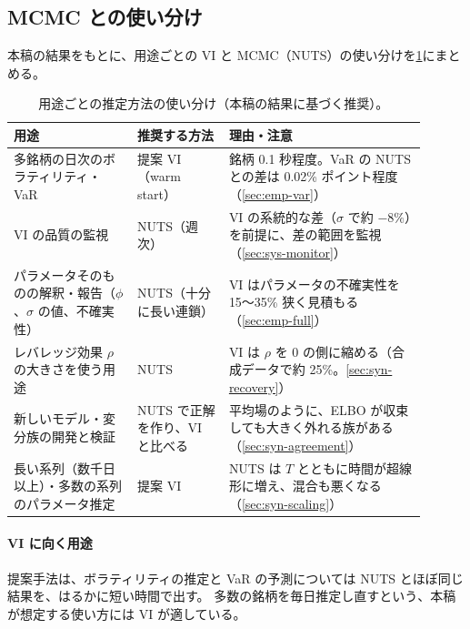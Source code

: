 \subsection{MCMC との使い分け}\label{sec:sys-roles}

本稿の結果をもとに、用途ごとの VI と MCMC（NUTS）の使い分けを\cref{tab:sys-roles}にまとめる。

\begin{table}[tbp]
  \centering
  \caption{用途ごとの推定方法の使い分け（本稿の結果に基づく推奨）。}
  \label{tab:sys-roles}
  \footnotesize
  \begin{tabular}{>{\raggedright\arraybackslash}p{0.27\linewidth}>{\raggedright\arraybackslash}p{0.2\linewidth}>{\raggedright\arraybackslash}p{0.43\linewidth}}
    \toprule
    用途 & 推奨する方法 & 理由・注意 \\
    \midrule
    多銘柄の日次のボラティリティ・VaR & 提案 VI（warm start） & 1 銘柄 0.1 秒程度。VaR の NUTS との差は 0.02\% ポイント程度（\cref{sec:emp-var}） \\
    \addlinespace
    VI の品質の監視 & NUTS（週次） & VI の系統的な差（$\sigma$ で約 $-8\%$）を前提に、差の範囲を監視（\cref{sec:sys-monitor}） \\
    \addlinespace
    パラメータそのものの解釈・報告（$\phi$、$\sigma$ の値、不確実性） & NUTS（十分に長い連鎖） & VI はパラメータの不確実性を 15〜35\% 狭く見積もる（\cref{sec:emp-full}） \\
    \addlinespace
    レバレッジ効果 $\rho$ の大きさを使う用途 & NUTS & VI は $\rho$ を 0 の側に縮める（合成データで約 25\%。\cref{sec:syn-recovery}） \\
    \addlinespace
    新しいモデル・変分族の開発と検証 & NUTS で正解を作り、VI と比べる & 平均場のように、ELBO が収束しても大きく外れる族がある（\cref{sec:syn-agreement}） \\
    \addlinespace
    長い系列（数千日以上）・多数の系列のパラメータ推定 & 提案 VI & NUTS は $T$ とともに時間が超線形に増え、混合も悪くなる（\cref{sec:syn-scaling}） \\
    \bottomrule
  \end{tabular}
\end{table}

\paragraph{VI に向く用途}
提案手法は、ボラティリティの推定と VaR の予測については NUTS とほぼ同じ結果を、はるかに短い時間で出す。
多数の銘柄を毎日推定し直すという、本稿が想定する使い方には VI が適している。

